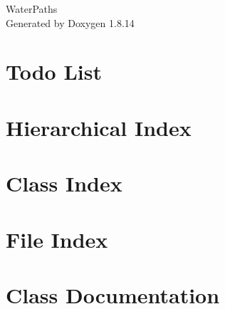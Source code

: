 \documentclass[twoside]{book}
\newcommand{\+}{\discretionary{\mbox{\scriptsize$\hookleftarrow$}}{}{}}
\newcommand{\clearemptydoublepage}{%
  \newpage{\pagestyle{empty}\cleardoublepage}%
}
\begin{document}
\hypersetup{pageanchor=false,
             bookmarksnumbered=true,
             pdfencoding=unicode
            }
\begin{titlepage}
\vspace*{7cm}
\begin{center}%
{\Large Water\+Paths }\\
\vspace*{1cm}
{\large Generated by Doxygen 1.8.14}\\
\end{center}
\end{titlepage}
\clearemptydoublepage
{}
\tableofcontents
\clearemptydoublepage
{}
\hypersetup{pageanchor=true}

\chapter{Todo List}
\label{todo}

\chapter{Hierarchical Index}

\chapter{Class Index}

\chapter{File Index}

\chapter{Class Documentation}
































\end{document}

